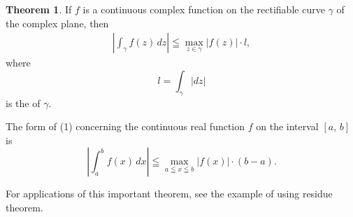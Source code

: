 \documentclass[12pt]{article}
\theoremstyle{definition}
\newtheorem*{thmplain}{Theorem}
\begin{document}
\begin{thmplain}
If $f$ is a continuous complex function on the rectifiable curve $\gamma$ of the complex plane, then
\begin{align}
\left|\int_\gamma f(z)\,dz\right| \leqq \max_{z\in\gamma} |f(z)|\cdot l,
\end{align}
where 
$$l = \int_\gamma|dz|$$
is the  of $\gamma$.
\end{thmplain}

The form of (1) concerning the continuous real function $f$ on the interval $[a,\,b]$ is
$$\left|\int_a^b f(x)\,dx\right| \leqq \max_{a\leqq x\leqq b} |f(x)|\cdot(b\!-\!a).$$

For applications of this important theorem, see the example of using residue theorem.
\end{document}
